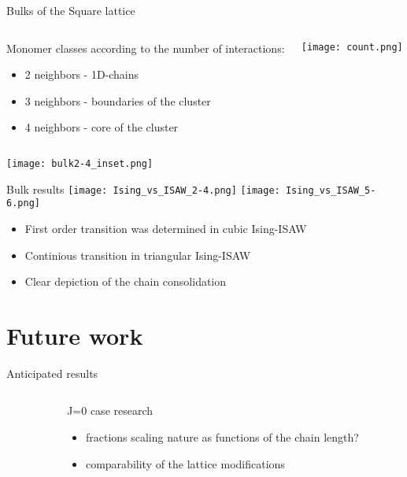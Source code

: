 \documentclass{beamer}
\begin{document}
\begin{frame}{Bulks of the Square lattice}
  \begin{columns}
    \begin{column}{.45\textwidth}
	Monomer classes according to the number of interactions:
	\begin{itemize}
	\item 2 neighbors - 1D-chains
	\item 3 neighbors - boundaries of the cluster
	\item 4 neighbors - core of the cluster
	\end{itemize}
    \end{column}
    \begin{column}{.45\textwidth}
	\centering
    	\texttt{[image: count.png]}
    \end{column}
  \end{columns}

\centering
\texttt{[image: bulk2-4\_inset.png]}
\end{frame}

\begin{frame}{Bulk results}
\texttt{[image: Ising\_vs\_ISAW\_2-4.png]}
\hfill
\texttt{[image: Ising\_vs\_ISAW\_5-6.png]}
\begin{itemize}
\item First order transition was determined in cubic Ising-ISAW
\item Continious transition in triangular Ising-ISAW
\item Clear depiction of the chain consolidation
\end{itemize}

\end{frame}

\section{Future work}

\begin{frame}{Anticipated results}
\begin{columns}[t]
    \begin{column}{.5\textwidth}
    \end{column}
    \begin{column}{.45\textwidth}
	\begin{exampleblock}{J=0 case research}
	\begin{itemize}
       		 \item fractions scaling nature as functions of the chain length?  
        		\item comparability of the lattice modifications
      	\end{itemize}
	\end{exampleblock}
    \end{column}
  \end{columns}
\end{frame}
\end{document}
